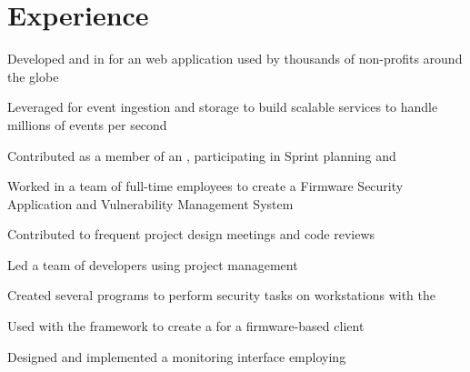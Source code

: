\documentclass[]{resume}
\begin{document}
\hfill
\begin{minipage}[t]{0.66\textwidth} 


\section{Experience}

\vspace{12pt}
\begin{tightemize}
\item Developed  and  in  for an web application used by thousands of non-profits around the globe
\item Leveraged  for event ingestion and  storage to build scalable services to handle millions of events per second
\item Contributed as a member of an , participating in Sprint planning and 
\end{tightemize}
\sectionsep
\vspace{10pt}

\vspace{4pt}
\begin{tightemize}\item Worked in a team of full-time employees to create a Firmware Security Application and Vulnerability Management System
\item Contributed to frequent project design meetings and code reviews
\item Led a team of developers using  project management
\item Created several  programs to perform security tasks on workstations with the 
\item Used  with the  framework to create a  for a firmware-based client
\item Designed and implemented a monitoring interface employing 
\end{tightemize}
\sectionsep
\vspace{10pt}


\end{minipage}
\end{document}
